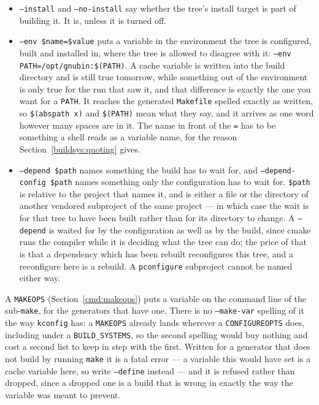 \documentclass{article}
\begin{document}
\begin{itemize}
\item \texttt{--install} and \texttt{--no-install} say whether the
  tree's install target is part of building it.  It is, unless it is
  turned off.

\item \texttt{--env \$name=\$value} puts a variable in the environment
  the tree is configured, built and installed in, where the tree is
  allowed to disagree with it: \texttt{--env
  PATH=/opt/gnubin:\$(PATH)}.  A cache variable is written into the
  build directory and is still true tomorrow, while something out of
  the environment is only true for the run that saw it, and that
  difference is exactly the one you want for a \texttt{PATH}.  It
  reaches the generated \texttt{Makefile} spelled exactly as written,
  so \texttt{\$(abspath x)} and \texttt{\$(PATH)} mean what they say,
  and it arrives as one word however many spaces are in it.  The name
  in front of the \texttt{=} has to be something a shell reads as a
  variable name, for the reason
  Section~\ref{buildsys:quoting} gives.

\item \texttt{--depend \$path} names something the build has to wait
  for, and \texttt{--depend-config \$path} names something only the
  configuration has to wait for.  \texttt{\$path} is relative to the
  project that names it, and is either a file or the directory of
  another vendored subproject of the same project --- in which case
  the wait is for that tree to have been built rather than for its
  directory to change.  A \texttt{--depend} is waited for by the
  configuration as well as by the build, since cmake runs the compiler
  while it is deciding what the tree can do; the price of that is that
  a dependency which has been rebuilt reconfigures this tree, and a
  reconfigure here is a rebuild.  A \texttt{pconfigure} subproject
  cannot be named either way.
\end{itemize}

A \texttt{MAKEOPS} (Section~\ref{cmd:makeops}) puts a variable on the
command line of the sub-\texttt{make}, for the generators that have
one.  There is no \texttt{--make-var} spelling of it the way
\texttt{kconfig} has: a \texttt{MAKEOPS} already lands wherever a
\texttt{CONFIGUREOPTS} does, including under a
\texttt{BUILD\_SYSTEMS}, so the second spelling would buy nothing and
cost a second list to keep in step with the first.  Written for a
generator that does not build by running \texttt{make} it is a fatal
error --- a variable this would have set is a cache variable here, so
write \texttt{--define} instead --- and it is refused rather than
dropped, since a dropped one is a build that is wrong in exactly the
way the variable was meant to prevent.
\end{document}
